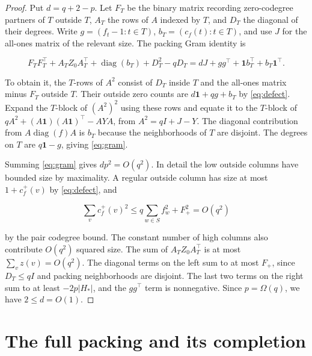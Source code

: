 \documentclass[11pt,reqno]{amsart}
\theoremstyle{definition}
\theoremstyle{remark}
\numberwithin{equation}{section}
\DeclareMathOperator{\diag}{diag}
\begin{document}
\begin{proof}
Put \(d=q+2-p\). Let \(F_T\) be the binary matrix recording zero-codegree partners of \(T\) outside \(T\), \(A_T\) the rows of \(A\) indexed by \(T\), and \(D_T\) the diagonal of their degrees. Write \(g=(f_t-1:t\in T)\), \(b_T=(c_f(t):t\in T)\), and use \(J\) for the all-ones matrix of the relevant size. The packing Gram identity is

\begin{equation}\label{eq:gram}
F_TF_T^{\top}+A_TZ_0A_T^{\top}
+\diag (b_T)+D_T^2-qD_T
=dJ+gg^{\top}+\mathbf1 b_T^{\top}+b_T\mathbf1^{\top}.
\end{equation}

To obtain it, the \(T\)-rows of \(A^2\) consist of \(D_T\) inside \(T\) and the all-ones matrix minus \(F_T\) outside \(T\). Their outside zero counts are \(d\mathbf1+qg+b_T\) by \eqref{eq:defect}. Expand the \(T\)-block of \((A^2)^2\) using these rows and equate it to the \(T\)-block of \(qA^2+(A\mathbf1)(A\mathbf1)^{\top}-AYA\), from \(A^2=qI+J-Y\). The diagonal contribution from \(A\diag (f)A\) is \(b_T\) because the neighborhoods of \(T\) are disjoint. The degrees on \(T\) are \(q\mathbf1-g\), giving \eqref{eq:gram}.

Summing \eqref{eq:gram} gives \(dp^2=O(q^2)\). In detail the low outside columns have bounded size by maximality. A regular outside column has size at most \(1+c_f^+(v)\) by \eqref{eq:defect}, and

\[
\sum_v c_f^+(v)^2\le q\sum_{w\in S} f_w^2+F_+^2=O(q^2)
\]

by the pair codegree bound. The constant number of high columns also contribute \(O(q^2)\) squared size. The sum of \(A_TZ_0A_T^{\top}\) is at most \(\sum_v z(v)=O(q^2)\). The diagonal terms on the left sum to at most \(F_+\), since \(D_T\le qI\) and packing neighborhoods are disjoint. The last two terms on the right sum to at least \(-2p|H_*|\), and the \(gg^{\top}\) term is nonnegative. Since \(p=\Omega(q)\), we have \(2\le d=O(1)\).
\end{proof}


\section{The full packing and its completion}\label{sec:completion}
\end{document}
